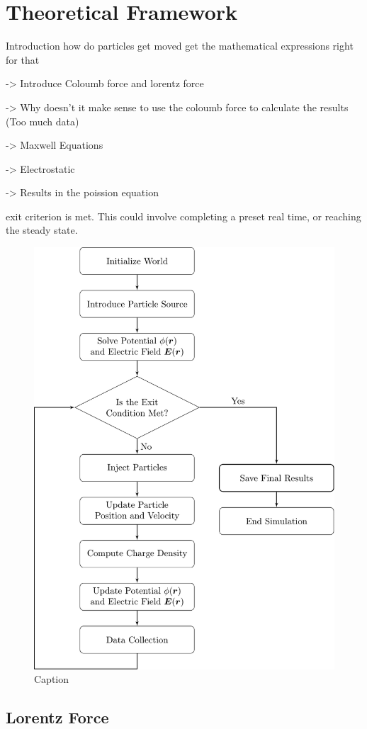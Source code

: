 \chapter{Theoretical Framework}

Introduction how do particles get moved get the mathematical expressions right for that 

-> Introduce Coloumb force and lorentz force 

-> Why doesn't it make sense to use the coloumb force to calculate the results (Too much data)

-> Maxwell Equations

-> Electrostatic 

-> Results in the poission equation

 exit criterion is met. This
could involve completing a preset real time, or reaching the steady state.



\begin{figure}[H]
    \centering
    \includegraphics[width=0.7\linewidth]{figures/chapter 2/Flowchart_Studienprojekt (1).png}
    \caption{Caption}
    \label{fig:enter-label}
\end{figure}

\section{Lorentz Force}

